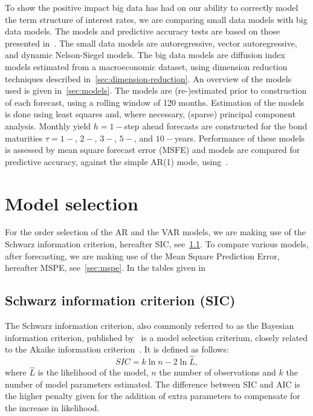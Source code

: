 To show the positive impact big data has had on our ability to correctly model the term structure of interest rates, we are comparing small data models with big data models. 
The models and predictive accuracy tests are based on those presented in~\textcite{swanson_big_2017}. 
The small data models are autoregressive, vector autoregressive, and dynamic Nelson-Siegel models. 
The big data models are diffusion index models estimated from a macroeconomic dataset, using dimension reduction techniques described in~\cref{sec:dimension-reduction}. 
An overview of the models used is given in~\cref{sec:models}.
The models are (re-)estimated prior to construction of each forecast, using a rolling window of 120 months.
Estimation of the models is done using least squares and, where necessary, (sparse) principal component analysis. 
Monthly yield $h = 1-$step ahead forecasts are constructed for the bond maturities $\tau = 1-$, $2-$, $3-$, $5-$, and $10-$years. 
Performance of these models is assessed by mean square forecast error (MSFE) and models are compared for predictive accuracy, against the simple AR(1) mode, using~\textcite[hereafter DM]{diebold_comparing_1994}. 

\section{Model selection}
For the order selection of the AR and the VAR models, we are making use of the Schwarz information criterion, hereafter SIC, see~\cref{sec:sic}. 
To compare various models, after forecasting, we are making use of the Mean Square Prediction Error, hereafter MSPE, see~\cref{sec:mspe}.
In the tables given in

\subsection{Schwarz information criterion (SIC)}
\label{sec:sic}
The Schwarz information criterion, also commonly referred to as the Bayesian information criterion, published by~\textcite[hereafter SIC]{schwarz_estimating_1978} is a model selection criterium, closely related to the Akaike information criterion~\parencite{akaike_new_1974}. 
It is defined as follows:
\begin{equation}
	SIC = k\ln{n} - 2\ln{\hat{L}},
\end{equation}
where $\hat{L}$ is the likelihood of the model, $n$ the number of observations and $k$ the number of model parameters estimated. The difference between SIC and AIC is the higher penalty given for the addition of extra parameters to compensate for the increase in likelihood.

